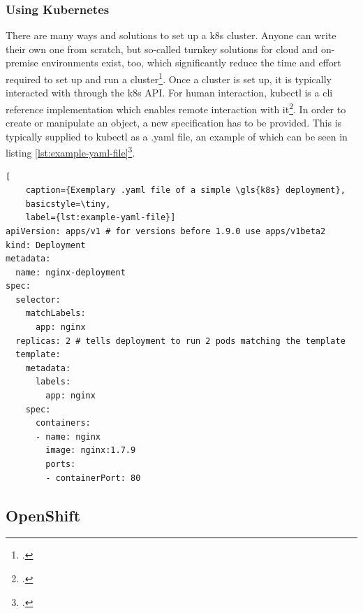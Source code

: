
\subsubsection{Using Kubernetes}
There are many ways and solutions to set up a \gls{k8s} cluster. Anyone can write their own one from scratch, but so-called turnkey solutions for cloud and on-premise environments exist, too, which significantly reduce the time and effort required to set up and run a cluster\footcite[][, sections 'Turnkey Cloud Solutions' and 'On-Premises turnkey cloud solutions']{turnkey}.
Once a cluster is set up, it is typically interacted with through the \gls{k8s} API. For human interaction, kubectl is a \gls{cli} reference implementation which enables remote interaction with it\footcite[][, section 'The Kubernetes API']{k8sApi}.
In order to create or manipulate an object, a new specification has to be provided. This is typically supplied to kubectl as a .yaml file, an example of which can be seen in listing \ref{lst:example-yaml-file}\footcite[][, section 'Describing a Kubernetes Object']{k8sObjects}.

\begin{lstlisting}[
	caption={Exemplary .yaml file of a simple \gls{k8s} deployment},
	basicstyle=\tiny,
	label={lst:example-yaml-file}]
apiVersion: apps/v1 # for versions before 1.9.0 use apps/v1beta2
kind: Deployment
metadata:
  name: nginx-deployment
spec:
  selector:
    matchLabels:
      app: nginx
  replicas: 2 # tells deployment to run 2 pods matching the template
  template:
    metadata:
      labels:
        app: nginx
    spec:
      containers:
      - name: nginx
        image: nginx:1.7.9
        ports:
        - containerPort: 80
\end{lstlisting}


\subsection{OpenShift} \label{openshiftExplanation}

